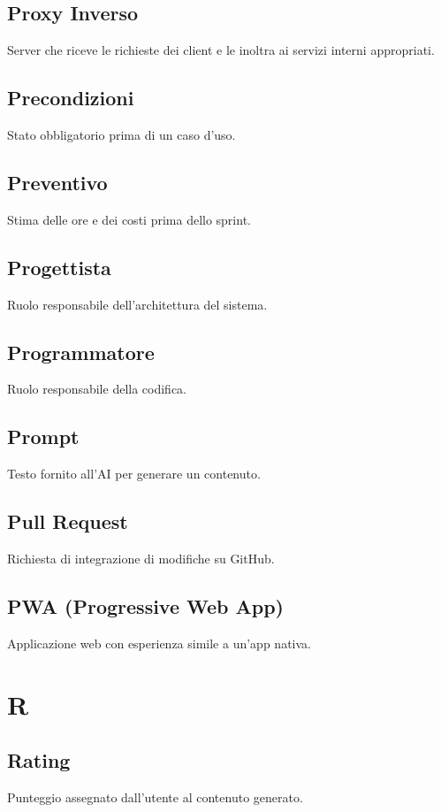 \documentclass[a4paper,12pt]{article}
\begin{document}
\subsection{Proxy Inverso}
Server che riceve le richieste dei client e le inoltra ai servizi interni appropriati.

\subsection{Precondizioni}
Stato obbligatorio prima di un caso d'uso.

\subsection{Preventivo}
Stima delle ore e dei costi prima dello sprint.

\subsection{Progettista}
Ruolo responsabile dell'architettura del sistema.

\subsection{Programmatore}
Ruolo responsabile della codifica.

\subsection{Prompt}
Testo fornito all'AI per generare un contenuto.

\subsection{Pull Request}
Richiesta di integrazione di modifiche su GitHub.

\subsection{PWA (Progressive Web App)}
Applicazione web con esperienza simile a un'app nativa.

\section{R}
\subsection{Rating}
Punteggio assegnato dall'utente al contenuto generato.
\end{document}
